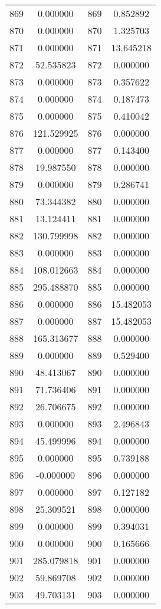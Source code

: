 \documentclass[12pt]{article}
\begin{document}
\begin{longtable}{@{}cccc@{}}
869 & 0.000000 & 869 & 0.852892 \\
870 & 0.000000 & 870 & 1.325703 \\
871 & 0.000000 & 871 & 13.645218 \\
872 & 52.535823 & 872 & 0.000000 \\
873 & 0.000000 & 873 & 0.357622 \\
874 & 0.000000 & 874 & 0.187473 \\
875 & 0.000000 & 875 & 0.410042 \\
876 & 121.529925 & 876 & 0.000000 \\
877 & 0.000000 & 877 & 0.143400 \\
878 & 19.987550 & 878 & 0.000000 \\
879 & 0.000000 & 879 & 0.286741 \\
880 & 73.344382 & 880 & 0.000000 \\
881 & 13.124411 & 881 & 0.000000 \\
882 & 130.799998 & 882 & 0.000000 \\
883 & 0.000000 & 883 & 0.000000 \\
884 & 108.012663 & 884 & 0.000000 \\
885 & 295.488870 & 885 & 0.000000 \\
886 & 0.000000 & 886 & 15.482053 \\
887 & 0.000000 & 887 & 15.482053 \\
888 & 165.313677 & 888 & 0.000000 \\
889 & 0.000000 & 889 & 0.529400 \\
890 & 48.413067 & 890 & 0.000000 \\
891 & 71.736406 & 891 & 0.000000 \\
892 & 26.706675 & 892 & 0.000000 \\
893 & 0.000000 & 893 & 2.496843 \\
894 & 45.499996 & 894 & 0.000000 \\
895 & 0.000000 & 895 & 0.739188 \\
896 & -0.000000 & 896 & 0.000000 \\
897 & 0.000000 & 897 & 0.127182 \\
898 & 25.309521 & 898 & 0.000000 \\
899 & 0.000000 & 899 & 0.394031 \\
900 & 0.000000 & 900 & 0.165666 \\
901 & 285.079818 & 901 & 0.000000 \\
902 & 59.869708 & 902 & 0.000000 \\
903 & 49.703131 & 903 & 0.000000 \\

\end{longtable}
\end{document}
